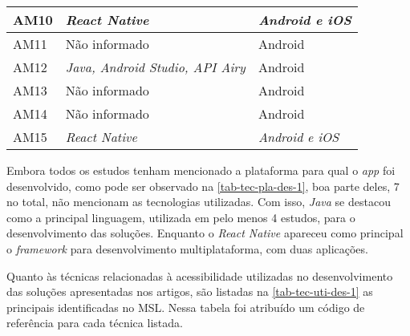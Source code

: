 \begin{table}[htb]
\begin{center}
\begin{tabular}{p{1.0cm}|p{8.0cm}|p{3.0cm}}
            \hline
            AM10            & \emph{React Native}                                              & \emph{Android e iOS} \\
            \hline
            AM11            & Não informado                                                    & Android       \\
            \hline
            AM12            & \emph{Java, Android Studio, API Airy}                            & Android       \\
            \hline
            AM13            & Não informado                                                    & Android       \\
            \hline
            AM14            & Não informado                                                    & Android       \\
            \hline
            AM15            & \emph{React Native}                                              & \emph{Android e iOS} \\
        \end{tabular}
    \end{center}
\end{table}

Embora todos os estudos tenham mencionado a plataforma para qual o \emph{app} foi desenvolvido,
como pode ser observado na \autoref{tab-tec-pla-des-1}, boa parte deles, 7 no total, não mencionam as tecnologias utilizadas.
Com isso, \emph{Java} se destacou como a principal linguagem, utilizada em pelo menos 4 estudos, para o desenvolvimento das soluções.
Enquanto o \emph{React Native} apareceu como principal o \emph{framework} para desenvolvimento multiplataforma, com duas aplicações.

\newpage

Quanto às técnicas relacionadas à acessibilidade utilizadas no desenvolvimento das soluções apresentadas nos artigos, são listadas
na \autoref{tab-tec-uti-des-1} as principais identificadas no MSL\@.
Nessa tabela foi atribuído um código de referência para cada técnica listada.

